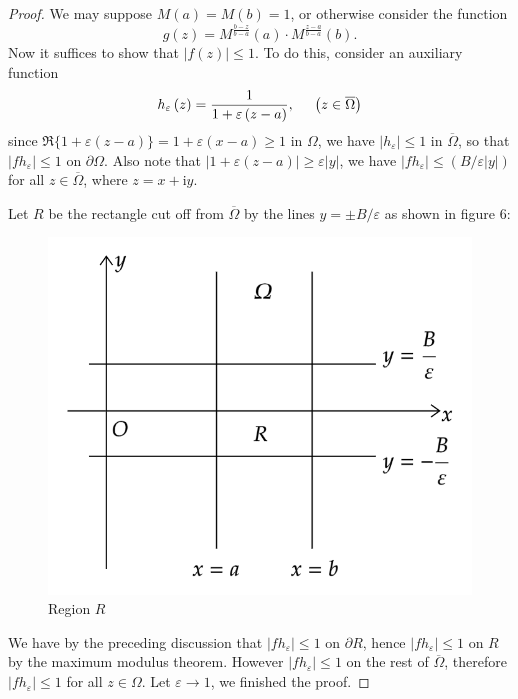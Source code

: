 \begin{proof}
We may suppose $M(a)=M(b)=1$, or otherwise consider the function 
$$
g\left( z \right) =M^{\frac{b-z}{b-a}}\left( a \right) \cdot M^{\frac{z-a}{b-a}}\left( b \right) .
$$
Now it suffices to show that $|f(z)|\le 1$. To do this, consider an auxiliary function 
$$
h_{\varepsilon}\left( z \right) =\frac{1}{1+\varepsilon \left( z-a \right)},\hspace{0.5cm}\left( z\in \overline{\Omega } \right) 
$$
since $\Re\{1+\varepsilon(z-a)\}=1+\varepsilon(x-a)\ge 1$ in $\Omega$, we have $|h_\varepsilon|\le 1$ in $\overline{\Omega}$, so that $|fh_\varepsilon|\le 1$ on $\partial\Omega$. Also note that $|1+\varepsilon(z-a)|\ge\varepsilon|y|$, we have $|fh_\varepsilon|\le(B/\varepsilon|y|)$ for all $z\in\overline{\Omega}$, where $z=x+\mathrm{i}y$.\par
Let $R$ be the rectangle cut off from $\overline{\Omega}$ by the lines $y=\pm B/\varepsilon$ as shown in figure 6: 
\begin{figure}[htbp]
    \center
    \includegraphics[scale=0.29]{img/region-R.png}
    \caption{Region $R$}
\end{figure}
We have by the preceding discussion that $|fh_\varepsilon|\le 1$ on $\partial R$, hence $|fh_\varepsilon|\le 1$ on $R$ by the maximum modulus theorem. However $|fh_\varepsilon|\le 1$ on the rest of $\overline{\Omega}$, therefore $|fh_\varepsilon|\le 1$ for all $z\in\Omega$. Let $\varepsilon\to 1$, we finished the proof.
\end{proof}
